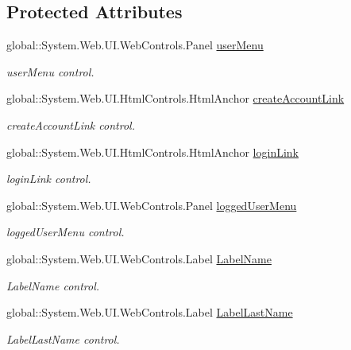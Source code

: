 \subsection*{Protected Attributes}
\begin{DoxyCompactItemize}
\item 
global\+::\+System.\+Web.\+U\+I.\+Web\+Controls.\+Panel \mbox{\hyperlink{classWebApplication_1_1SiteMaster_a0c71f5770925f8c600ac941c4f258dec}{user\+Menu}}
\begin{DoxyCompactList}\small\item\em user\+Menu control. \end{DoxyCompactList}\item 
global\+::\+System.\+Web.\+U\+I.\+Html\+Controls.\+Html\+Anchor \mbox{\hyperlink{classWebApplication_1_1SiteMaster_a085178ad4ea764721387a99e79a79c1d}{create\+Account\+Link}}
\begin{DoxyCompactList}\small\item\em create\+Account\+Link control. \end{DoxyCompactList}\item 
global\+::\+System.\+Web.\+U\+I.\+Html\+Controls.\+Html\+Anchor \mbox{\hyperlink{classWebApplication_1_1SiteMaster_a2a39715c1c4cf02add7dcc3edb7575ef}{login\+Link}}
\begin{DoxyCompactList}\small\item\em login\+Link control. \end{DoxyCompactList}\item 
global\+::\+System.\+Web.\+U\+I.\+Web\+Controls.\+Panel \mbox{\hyperlink{classWebApplication_1_1SiteMaster_a2c15591013d1e6ae617573ae910128f6}{logged\+User\+Menu}}
\begin{DoxyCompactList}\small\item\em logged\+User\+Menu control. \end{DoxyCompactList}\item 
global\+::\+System.\+Web.\+U\+I.\+Web\+Controls.\+Label \mbox{\hyperlink{classWebApplication_1_1SiteMaster_add9db19501eab2adeff5c50cb5736bb5}{Label\+Name}}
\begin{DoxyCompactList}\small\item\em Label\+Name control. \end{DoxyCompactList}\item 
global\+::\+System.\+Web.\+U\+I.\+Web\+Controls.\+Label \mbox{\hyperlink{classWebApplication_1_1SiteMaster_afeb8f86976a4f7ac34b672b37d1ee0c7}{Label\+Last\+Name}}
\begin{DoxyCompactList}\small\item\em Label\+Last\+Name control. \end{DoxyCompactList}\item 

\end{DoxyCompactItemize}
